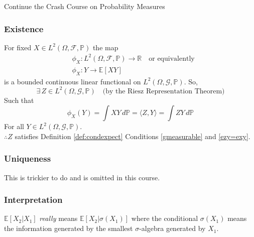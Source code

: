 \documentclass[12pt]{article}
\begin{document}
\begin{section}{Continue the Crash Course on Probability Measures}
\subsubsection{Existence} For fixed $X\in L^2(\Omega,\mathcal F,\mathbb P)$ the map 
\begin{align*}
&\phi_X : L^2(\Omega, \mathcal F, \mathbb P) \rightarrow \mathbb R \quad \text{or equivalently} \\
&\phi_X : Y \rightarrow \mathbb E[XY]
\end{align*}
is a bounded continuous linear functional on $L^2(\Omega, \mathcal G, \mathbb P)$. So,
\begin{equation*}
	\exists\,Z \in L^2(\Omega, \mathcal G, \mathbb P) \quad \text{(by the Riesz Representation Theorem)}
\end{equation*}
Such that
\begin{equation*}
	\phi_X(Y) = \int XY\,d\mathbb P = \langle Z, Y\rangle = \int ZY\,d\mathbb P
\end{equation*}
For all $Y \in L^2(\Omega, \mathcal G, \mathbb P)$. \\
$\therefore Z$ satisfies Definition \ref{def:condexpect} Conditions \ref{gmeasurable} and \ref{ezy=exy}. 

\subsubsection{Uniqueness} This is trickier to do and is omitted in this course.

\subsubsection{Interpretation} $\mathbb E[X_2|X_1]$ {\em really} means $\mathbb E[X_2 | \sigma (X_1)]$ where the conditional $\sigma(X_1)$ means the information generated by the smallest $\sigma$-algebra generated by $X_1$.


\end{section}
\end{document}
